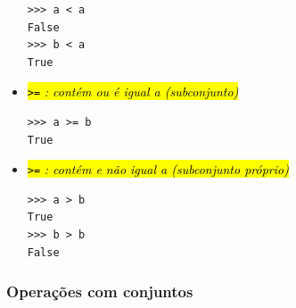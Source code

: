 \begin{itemize}
\begin{lstlisting}
>>> a < a
False
>>> b < a
True
\end{lstlisting}

\item \hl{{\lstinline+>=+} \emph{: contém ou é igual a (subconjunto)}}

\begin{lstlisting}
>>> a >= b
True
\end{lstlisting}

\item \hl{{\lstinline+>=+} \emph{: contém e não igual a (subconjunto próprio)}}

\begin{lstlisting}
>>> a > b
True
>>> b > b
False
\end{lstlisting}
\end{itemize}

\subsubsection{Operações com conjuntos}

